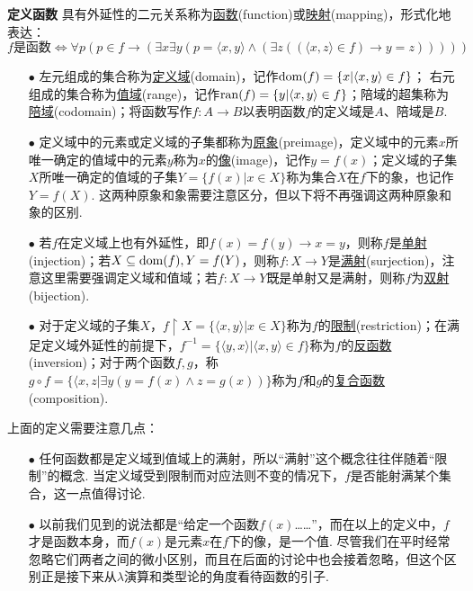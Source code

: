 \documentclass[UTF8]{ctexart}
\newcommand{\trm}[1]{{\rm #1}}
\newenvironment{definition}[1]
    {\begin{tcolorbox}[enhanced, colback=LightYellow, breakable=false, frame hidden, borderline west={1.5mm}{-2mm}{DarkGreen}]
    {\bfseries {\color{DarkGreen} 定义}\quad #1} \newline}
    {\end{tcolorbox}}
\begin{document}
\begin{definition}{函数}
    具有外延性的二元关系称为\uline{函数}(function)或\uline{映射}(mapping)，形式化地表达：
    \[f \mbox{是函数} \Longleftrightarrow \forall p (p \in f \rightarrow (\exists x \exists y(p = \langle x,y \rangle \wedge (\exists z((\langle x,z \rangle \in f) \rightarrow y=z)))))\]
    \begin{itemize}
        \item [\(\bullet\)] 左元组成的集合称为\uline{定义域}(domain)，记作\(\trm{dom}(f)= \{x | \langle x,y \rangle \in f\}\)； 右元组成的集合称为\uline{值域}(range)，记作\(\trm{ran}(f)= \{y | \langle x,y \rangle \in f\}\)；陪域的超集称为\uline{陪域}(codomain)；将函数写作\(f:A \to B\)以表明函数\(f\)的定义域是\(A\)、陪域是\(B\).
        \item [\(\bullet\)] 定义域中的元素或定义域的子集都称为\uline{原象}(preimage)，定义域中的元素\(x\)所唯一确定的值域中的元素\(y\)称为\(x\)的\uline{像}(image)，记作\(y=f(x)\)；定义域的子集\(X\)所唯一确定的值域的子集\(Y=\{f(x)|x \in X\}\)称为集合\(X\)在\(f\)下的象，也记作\(Y=f(X)\). 这两种原象和象需要注意区分，但以下将不再强调这两种原象和象的区别.
        \item [\(\bullet\)] 若\(f\)在定义域上也有外延性，即\(f(x)=f(y) \rightarrow x=y\)，则称\(f\)是\uline{单射}(injection)；若\(X\subseteq\trm{dom}(f), Y=f(Y)\)，则称\(f:X\to Y\)是\uline{满射}(surjection)，注意这里需要强调定义域和值域；若\(f:X \to Y\)既是单射又是满射，则称\(f\)为\uline{双射}(bijection).
        \item [\(\bullet\)] 对于定义域的子集\(X\)，\(f\upharpoonright X=\{\langle x,y \rangle|x \in X\}\)称为\(f\)的\uline{限制}(restriction)；在满足定义域外延性的前提下，\(f^{-1}=\{\langle y,x \rangle | \langle x,y \rangle \in f\}\)称为\(f\)的\uline{反函数}(inversion)；对于两个函数\(f,g\)，称\(g \circ f = \{\langle x,z | \exists y(y=f(x) \wedge z=g(x))\}\)称为\(f\)和\(g\)的\uline{复合函数}(composition).
    \end{itemize}
\end{definition}

上面的定义需要注意几点：
\begin{itemize}
    \item [\(\bullet\)] 任何函数都是定义域到值域上的满射，所以“满射”这个概念往往伴随着“限制”的概念. 当定义域受到限制而对应法则不变的情况下，\(f\)是否能射满某个集合，这一点值得讨论.
    \item [\(\bullet\)] 以前我们见到的说法都是“给定一个函数\(f(x)\)……”，而在以上的定义中，\(f\)才是函数本身，而\(f(x)\)是元素\(x\)在\(f\)下的像，是一个值. 尽管我们在平时经常忽略它们两者之间的微小区别，而且在后面的讨论中也会接着忽略，但这个区别正是接下来从\(\lambda\)演算和类型论的角度看待函数的引子.
\end{itemize}
\end{document}
